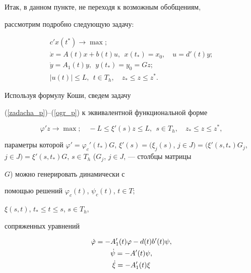 Итак, в данном пункте, не переходя к возможным обобщениям,


рассмотрим подробно следующую задачу:


\begin{gather}


\label{zadacha_p}


c'x(t^*) \to \max; \\


%


\label{dyn_sys_p}


\Dot{x} = A(t)x + b(t)u, \ \ x(t_*) = x_0, \quad u = d'(t)y; \\


%


\label{dyn_sys_y}


\Dot{y} = A_1(t)y, \ \ y(t_*) = y_0 = Gz; \\


%


\label{ogr_p}


|u(t)| \leq L, \ \ t \in T_h, \quad z_* \leq z \leq z^*.


\end{gather}





Используя формулу Коши, сведем задачу


(\ref{zadacha_p})--(\ref{ogr_p}) к эквивалентной функциональной форме


\begin{equation}\label{zadacha_p_lp}


\varphi'z \to \max; \quad -L \leq \xi'(s) z \leq L, \ \ s \in T_h,


\quad z_* \leq z \leq z^*,


\end{equation}


параметры которой $\varphi' = \varphi_{c}'(t_*)G$, $\xi'(s) =


(\xi_j(s)$, $j \in J) = (\xi'(s,t_*)G_j$, $j \in J) =


\xi'(s,t_*)G$, $s \in T_h$ ($G_j$, $j \in J$, --- столбцы матрицы


$G$) можно генерировать динамически с


помощью решений $\varphi_c(t)$, $\psi_c(t)$, $t \in T$;


$\xi(s,t)$, $t_* \leq t \leq s$, $s \in T_h$,


сопряженных уравнений


\begin{gather}


\label{sopr_sys1}


\Dot{\varphi} = -A_1'(t)\varphi - d(t)b'(t)\psi, \\


%


\label{sopr_sys2}


\Dot{\psi} = -A'(t)\psi, \\


%


\Dot{\xi} = -A_1'(t)\xi \notag


\end{gather}


